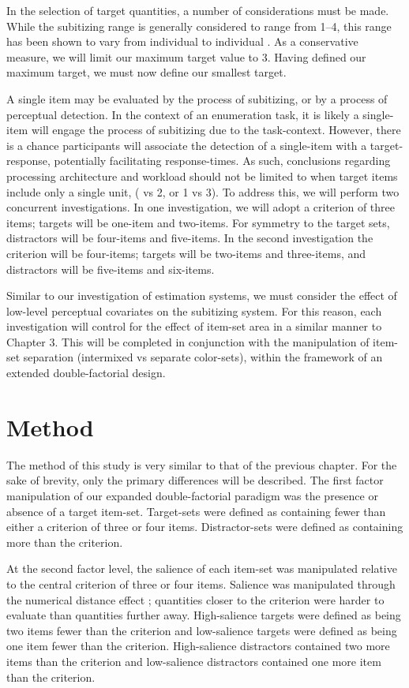 In the selection of target quantities, a number of considerations must be made. While the subitizing range is generally considered to range from 1--4, this range has been shown to vary from individual to individual \cite<for example,>{green2003action}. As a conservative measure, we will limit our maximum target value to 3. Having defined our maximum target, we must now define our smallest target. 

A single item may be evaluated by the process of subitizing, or by a process of perceptual detection. In the context of an enumeration task, it is likely a single-item will engage the process of subitizing due to the task-context. However, there is a chance participants will associate the detection of a single-item with a target-response, potentially facilitating response-times. As such, conclusions regarding processing architecture and workload should not be limited to when target items include only a single unit, ( vs 2, or 1 vs 3). To address this, we will perform two concurrent investigations. In one investigation, we will adopt a criterion of three items; targets will be one-item and two-items. For symmetry to the target sets, distractors will be four-items and five-items. In the second investigation the criterion will be four-items; targets will be two-items and three-items, and distractors will be five-items and six-items. 

Similar to our investigation of estimation systems, we must consider the effect of low-level perceptual covariates on the subitizing system. For this reason, each investigation will control for the effect of item-set area in a similar manner to Chapter 3. This will be completed in conjunction with the manipulation of item-set separation (intermixed vs separate color-sets), within the framework of an extended double-factorial design.


\section{Method}
The method of this study is very similar to that of the previous chapter. For the sake of brevity, only the primary differences will be described. The first factor manipulation of our expanded double-factorial paradigm was the presence or absence of a target item-set. Target-sets were defined as containing fewer than either a criterion of three or four items. Distractor-sets were defined as containing more than the criterion. 

At the second factor level, the salience of each item-set was manipulated relative to the central criterion of three or four items. Salience was manipulated through the numerical distance effect \cite{buckley1974comparisons}; quantities closer to the criterion were harder to evaluate than quantities further away. High-salience targets were defined as being two items fewer than the criterion and low-salience targets were defined as being one item fewer than the criterion. High-salience distractors contained two more items than the criterion and low-salience distractors contained one more item than the criterion.

